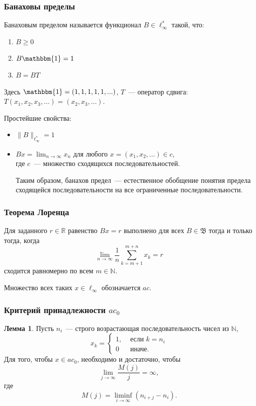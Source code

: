 \documentclass[10pt,pdf,hyperref={unicode},aspectratio=169]{beamer}
\theoremstyle{definition}
\newtheorem{llemma}{Лемма}
\begin{document}
\begin{frame}\frametitle{Банаховы пределы}
	Банаховым пределом называется функционал $B\in \ell_\infty^*$ такой, что:
	\begin{enumerate}
		\item
			$B \geqslant 0$
		\item
			$B\mathbbm{1} = 1$
		\item
			$B=BT$
	\end{enumerate}
	Здесь $\mathbbm{1}=(1,1,1,1,1,...)$,
	$T$~--- оператор сдвига: $T(x_1, x_2, x_3, ...) = (x_2, x_3, ...)$.

	Простейшие свойства:
	\begin{itemize}
		\item
			$\|B\|_{\ell_\infty^*} = 1$
		\item
			$Bx = \lim_{n\to\infty} x_n$ для любого $x=(x_1, x_2, ...) \in c$,
			\\
			где $c$~--- множество сходящихся последовательностей.

			Таким образом,
			банахов предел~--- естественное обобщение понятия предела сходящейся последовательности
			на все ограниченные последовательности.
	\end{itemize}
\end{frame}

\begin{frame}\frametitle{Теорема Лоренца}
	Для заданного $r\in\mathbb{R}$ равенство $Bx=r$ выполнено для всех $B\in\mathfrak{B}$
	тогда и только тогда, когда
	\begin{equation*}
		\lim_{n\to\infty} \frac{1}{n} \sum_{k=m+1}^{m+n} x_k = r
	\end{equation*}
	сходится равномерно по всем $m\in\mathbb{N}$.

	Множество всех таких $x \in \ell_\infty$ обозначается $ac$.
\end{frame}



\begin{frame}
	\frametitle{Критерий принадлежности $ac_0$~\cite{our-mz2019ac0}}


	\begin{llemma}
		Пусть $n_i$~--- строго возрастающая последовательность чисел из $\mathbb{N}$,
		\begin{equation*}
			x_k = \left\{\begin{array}{ll}
				1, & \mbox{~если~} k = n_i
				\\
				0  & \mbox{~иначе.~}
			\end{array}\right.
		\end{equation*}
		Для того, чтобы $x\in ac_0$,
		необходимо и достаточно, чтобы
		\begin{equation}\label{lim_M(j)/j}
			\lim_{j \to \infty} \frac{M(j)}{j} = \infty
			,
		\end{equation}
		где
		\begin{equation*}
			M(j) = \liminf_{i\to\infty} (n_{i+j} - n_i)
			.
		\end{equation*}
	\end{llemma}


\end{frame}
\end{document}
